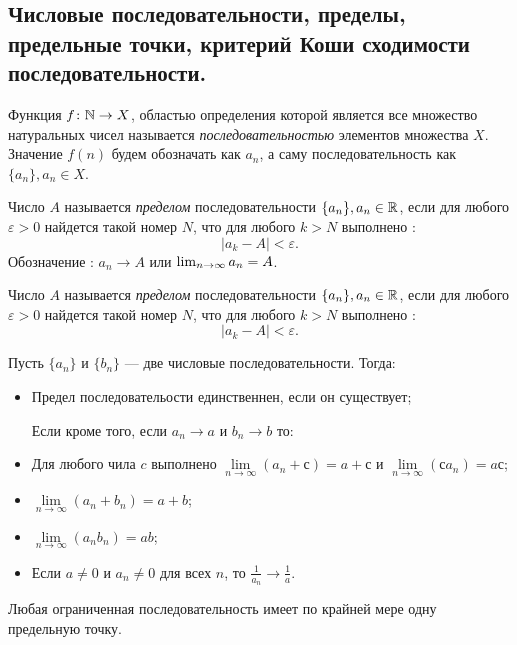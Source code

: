 \subsection{Числовые последовательности, пределы, предельные точки, критерий Коши сходимости последовательности.}

\begin{defin}
	Функция \(f\colon\mathbb{N}\to X\), областью определения которой является все множество натуральных чисел называется \textit{последовательностью} элементов множества \(X\). Значение \(f(n)\) будем обозначать как \(a_n\), а саму последовательность как \(\{a_n\}, a_n\in X\).
\end{defin}

\begin{defin}
	Число \(A\) называется \textit{пределом} последовательности \(\{a_n\}, a_n\in\mathbb{R}\), если для любого \(\varepsilon > 0\) найдется такой номер \(N\), что для любого \(k > N\) выполнено : \[|a_k-A| < \varepsilon.\] Обозначение : \(a_n\to A\) или \(\lim_{n\to\infty}a_n\hm=A\).
\end{defin}

\begin{defin}
	Число \(A\) называется \textit{пределом} последовательности \(\{a_n\}, a_n\in\mathbb{R}\), если для любого \(\varepsilon > 0\) найдется такой номер \(N\), что для любого \(k > N\) выполнено : \[|a_k-A| < \varepsilon.\]
\end{defin}

{\footnotesize \begin{proposition}
	Пусть \(\{a_n\}\) и \(\{b_n\}\) --- две числовые последовательности. Тогда:
	\begin{itemize}
		\item Предел последовательости единственнен, если он существует;
		
		Если кроме того, если \(a_n\to a\) и \(b_n\to b\) то:
		\item Для любого чила \(c\) выполнено \(\lim\limits_{n\to\infty}(a_n + с) = a + с \) и \(\lim\limits_{n\to\infty}(сa_n) = aс\);
		\item \(\lim\limits_{n\to\infty}(a_n + b_n) = a + b \);
		\item \(\lim\limits_{n\to\infty}(a_nb_n) = ab\);
		\item Если \(a\neq0\) и \(a_n\neq0\) для всех \(n\), то \(\frac{1}{a_n}\to\frac{1}{a}\).
	\end{itemize}
\end{proposition}

\begin{theorem}
	Любая ограниченная последовательность имеет по крайней мере одну предельную точку.
\end{theorem}}

